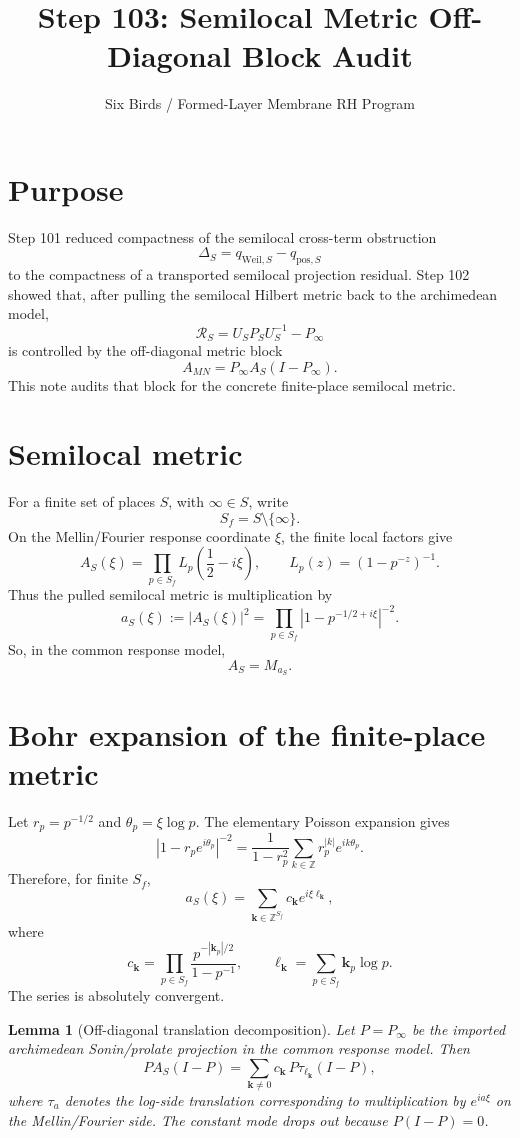 \documentclass[11pt]{article}
\title{Step 103: Semilocal Metric Off-Diagonal Block Audit}
\author{Six Birds / Formed-Layer Membrane RH Program}
\date{}
\newtheorem{lemma}{Lemma}
\begin{document}
\maketitle

\section{Purpose}

Step 101 reduced compactness of the semilocal cross-term obstruction
\[
  \Delta_S=q_{\mathrm{Weil},S}-q_{\mathrm{pos},S}
\]
to the compactness of a transported semilocal projection residual.  Step 102
showed that, after pulling the semilocal Hilbert metric back to the
archimedean model,
\[
  \mathcal R_S=U_SP_SU_S^{-1}-P_\infty
\]
is controlled by the off-diagonal metric block
\[
  A_{MN}=P_\infty A_S(I-P_\infty).
\]
This note audits that block for the concrete finite-place semilocal metric.

\section{Semilocal metric}

For a finite set of places \(S\), with \(\infty\in S\), write
\[
  S_f=S\setminus\{\infty\}.
\]
On the Mellin/Fourier response coordinate \(\xi\), the finite local factors
give
\[
  A_S(\xi)=\prod_{p\in S_f}L_p\left(\frac12-i\xi\right),
  \qquad
  L_p(z)=(1-p^{-z})^{-1}.
\]
Thus the pulled semilocal metric is multiplication by
\[
  a_S(\xi):=|A_S(\xi)|^2
  =
  \prod_{p\in S_f}
  \left|1-p^{-1/2+i\xi}\right|^{-2}.
\]
So, in the common response model,
\[
  A_S=M_{a_S}.
\]

\section{Bohr expansion of the finite-place metric}

Let \(r_p=p^{-1/2}\) and \(\theta_p=\xi\log p\).  The elementary Poisson
expansion gives
\[
  |1-r_pe^{i\theta_p}|^{-2}
  =
  \frac{1}{1-r_p^2}
  \sum_{k\in\mathbb Z} r_p^{|k|}e^{ik\theta_p}.
\]
Therefore, for finite \(S_f\),
\[
  a_S(\xi)
  =
  \sum_{\mathbf k\in\mathbb Z^{S_f}}
  c_{\mathbf k}
  e^{i\xi\ell_{\mathbf k}},
\]
where
\[
  c_{\mathbf k}
  =
  \prod_{p\in S_f}
  \frac{p^{-|\mathbf k_p|/2}}{1-p^{-1}},
  \qquad
  \ell_{\mathbf k}
  =
  \sum_{p\in S_f}\mathbf k_p\log p.
\]
The series is absolutely convergent.

\begin{lemma}[Off-diagonal translation decomposition]
Let \(P=P_\infty\) be the imported archimedean Sonin/prolate projection in
the common response model. Then
\[
  P A_S(I-P)
  =
  \sum_{\mathbf k\ne0}
  c_{\mathbf k}\,
  P\tau_{\ell_{\mathbf k}}(I-P),
\]
where \(\tau_a\) denotes the log-side translation corresponding to
multiplication by \(e^{ia\xi}\) on the Mellin/Fourier side.  The constant
mode drops out because \(P(I-P)=0\).
\end{lemma}
\end{document}
